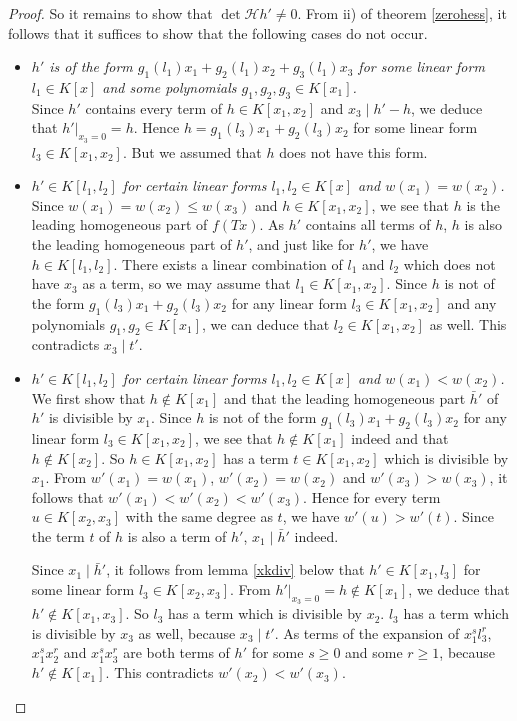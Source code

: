\documentclass[10pt]{article}
\theoremstyle{remark}
\theoremstyle{definition}
\newcommand{\hess}{{\mathcal H}}
\begin{document}
\begin{proof}
So it remains to show that $\det \hess h' \ne 0$. From ii) of theorem \ref{zerohess}, it follows 
that it suffices to show that the following cases do not occur.
\begin{itemize}

\item \emph{$h'$ is of the form $g_1(l_1) x_1 + g_2(l_1) x_2 + g_3(l_1)x_3$ for some
linear form $l_1 \in K[x]$ and some polynomials $g_1,g_2,g_3 \in K[x_1]$.} \\
Since $h'$ contains every term of $h \in K[x_1,x_2]$ and $x_3 \mid h'-h$, we deduce that
$h'|_{x_3=0} = h$. Hence $h = g_1(l_3) x_1 + g_2(l_3) x_2$ for some linear form $l_3 \in 
K[x_1,x_2]$. But we assumed that $h$ does not have this form.

\item \emph{$h' \in K[l_1,l_2]$ for certain linear forms $l_1, l_2 \in K[x]$ and
$w(x_1) = w(x_2)$.} \\
Since $w(x_1) = w(x_2) \le w(x_3)$ and $h \in K[x_1,x_2]$, we see that $h$ is the
leading homogeneous part of $f(Tx)$. As $h'$ contains all terms of $h$, $h$ is also 
the leading homogeneous part of $h'$, and just like for $h'$, we have $h \in K[l_1,l_2]$.
There exists a linear combination of $l_1$ and $l_2$ which does not have $x_3$ as a term,
so we may assume that $l_1 \in K[x_1,x_2]$.
Since $h$ is not of the form $g_1(l_3) x_1 + g_2(l_3) x_2$ for any linear form 
$l_3 \in K[x_1,x_2]$ and any polynomials $g_1, g_2 \in K[x_1]$, we can deduce that 
$l_2 \in K[x_1,x_2]$ as well. This contradicts $x_3 \mid t'$.

\item \emph{$h' \in K[l_1,l_2]$ for certain linear forms $l_1, l_2 \in K[x]$ and
$w(x_1) < w(x_2)$.} \\
We first show that $h \notin K[x_1]$ and that the leading homogeneous part $\bar{h}'$ of $h'$ 
is divisible by $x_1$. Since $h$ is not of the form $g_1(l_3) x_1 + g_2(l_3) x_2$ for any linear form 
$l_3 \in K[x_1,x_2]$, we see that $h \notin K[x_1]$ indeed and that $h \notin K[x_2]$. 
So $h \in K[x_1,x_2]$ has a term $t \in K[x_1,x_2]$ which is divisible by $x_1$. 
From $w'(x_1) = w(x_1)$, $w'(x_2) = w(x_2)$ and $w'(x_3) > w(x_3)$, it follows that 
$w'(x_1) < w'(x_2) < w'(x_3)$. Hence for every term $u \in K[x_2,x_3]$ with the same
degree as $t$, we have $w'(u) > w'(t)$. Since the term $t$ of $h$ is also a term of $h'$,
$x_1 \mid \bar{h}'$ indeed.

Since $x_1 \mid \bar{h}'$, it follows from lemma \ref{xkdiv} below that 
$h' \in K[x_1,l_3]$ for some linear form $l_3 \in K[x_2,x_3]$. From
$h'|_{x_3=0} = h \notin K[x_1]$, we deduce that
$h' \notin K[x_1,x_3]$. So $l_3$ has a term which is divisible by $x_2$. 
$l_3$ has a term which is divisible by $x_3$ as well,
because $x_3 \mid t'$.
As terms of the expansion of $x_1^s l_3^r$, $x_1^s x_2^r$ and $x_1^s x_3^r$ are both terms of $h'$
for some $s \ge 0$ and some $r \ge 1$, because $h' \notin K[x_1]$. 
This contradicts $w'(x_2) < w'(x_3)$. \qedhere

\end{itemize}
\end{proof}
\end{document}
